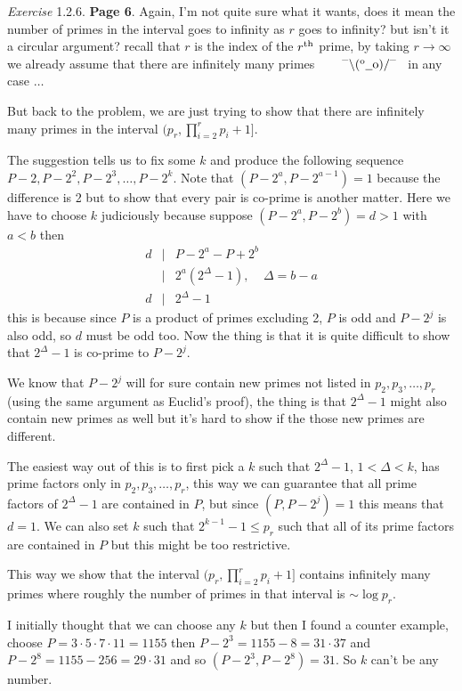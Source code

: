 \documentclass[aps,preprint,preprintnumbers,nofootinbib,showpacs,prd]{revtex4-1}
\newcommand{\nbea}{\begin{eqnarray*}}
\newcommand{\neea}{\end{eqnarray*}}
\newcommand{\dunno}{$ {}^{\mbox {--}}\backslash(^{\rm o}{}\underline{\hspace{0.2cm}}{\rm o})/^{\mbox {--}}$}
\begin{document}
{\it Exercise} 1.2.6. {\bf Page 6}. Again, I'm not quite sure what it wants, does it mean the number of primes in the interval goes to infinity as $r$ goes to infinity? but isn't it a circular argument? recall that $r$ is the index of the $r^{\rm th}$ prime, by taking $r\to\infty$ we already assume that there are infinitely many primes ~~~ \dunno ~ in any case $\dots$


But back to the problem, we are just trying to show that there are infinitely many primes in the interval $(p_r, \prod_{i=2}^r p_i + 1]$.

The suggestion tells us to fix some $k$ and produce the following sequence $P-2, P-2^2, P-2^3, \dots, P-2^k$.  Note that $(P-2^a, P-2^{a-1})=1$ because the difference is 2 but to show that every pair is co-prime is another matter. Here we have to choose $k$ judiciously because suppose $(P-2^a, P-2^b) = d > 1$ with $a < b$ then
%
\nbea
d &|& P - 2^a - P + 2^b \\
&|& 2^a(2^\Delta - 1), ~~~~~ \Delta = b-a \\
d &|& 2^\Delta - 1
\neea
%
this is because since $P$ is a product of primes excluding 2, $P$ is odd and $P-2^j$ is also odd, so $d$ must be odd too. Now the thing is that it is quite difficult to show that $2^\Delta - 1$ is co-prime to $P-2^j$.

We know that $P-2^j$ will for sure contain new primes not listed in $p_2,p_3,\dots,p_r$ (using the same argument as Euclid's proof), the thing is that $2^\Delta - 1$ might also contain new primes as well but it's hard to show if the those new primes are different.

The easiest way out of this is to first pick a $k$ such that $2^\Delta - 1$, $1 < \Delta < k$, has prime factors only in $p_2, p_3, \dots, p_r$, this way we can guarantee that all prime factors of $2^\Delta - 1$ are contained in $P$, but since $(P,P-2^j)=1$ this means that $d=1$. We can also set $k$ such that $2^{k-1} - 1 \le p_r$ such that all of its prime factors are contained in $P$ but this might be too restrictive.

This way we show that the interval $(p_r,\prod_{i=2}^r p_i + 1]$ contains infinitely many primes where roughly the number of primes in that interval is $\sim\log p_r$.

I initially thought that we can choose any $k$ but then I found a counter example, choose $P = 3\cdot5\cdot7\cdot11 = 1155$ then $P - 2^3 = 1155 - 8 = 31\cdot37$ and $P - 2^8 = 1155 - 256 = 29\cdot31$ and so $(P-2^3, P-2^8) = 31$. So $k$ can't be any number.
\end{document}
